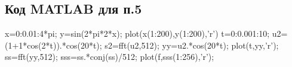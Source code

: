 \documentclass[10pt,a4paper]{article}
\begin{document}
\subsection{Код MATLAB для п.5}
 x=0:0.01:4*pi;\newline
y=sin(2*pi*2*x); \newline
plot(x(1:200),y(1:200),'r')\newline 
t=0:0.001:10;\newline
u2=(1+1*cos(2*t)).*cos(20*t);\newline
s2=fft(u2,512);\newline
yy=u2.*cos(20*t);\newline
plot(t,yy,'r');\newline
ss=fft(yy,512);\newline
sss=ss.*conj(ss)/512;\newline
plot(f,sss(1:256),'r');\newline
\end{document}
